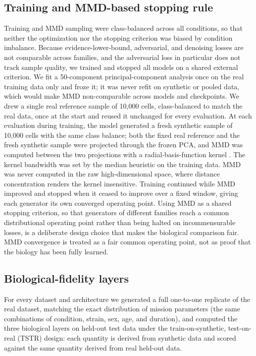 \documentclass[11pt]{article}
\begin{document}
\subsection{Training and MMD-based stopping rule}
Training and MMD sampling were class-balanced across all conditions, so that neither the optimization nor the stopping criterion was biased by condition imbalance. Because evidence-lower-bound, adversarial, and denoising losses are not comparable across families, and the adversarial loss in particular does not track sample quality, we trained and stopped all models on a shared external criterion. We fit a 50-component principal-component analysis once on the real training data only and froze it; it was never refit on synthetic or pooled data, which would make MMD non-comparable across models and checkpoints. We drew a single real reference sample of 10{,}000 cells, class-balanced to match the real data, once at the start and reused it unchanged for every evaluation. At each evaluation during training, the model generated a fresh synthetic sample of 10{,}000 cells with the same class balance; both the fixed real reference and the fresh synthetic sample were projected through the frozen PCA, and MMD was computed between the two projections with a radial-basis-function kernel \cite{gretton,sutherland}. The kernel bandwidth was set by the median heuristic on the training data. MMD was never computed in the raw high-dimensional space, where distance concentration renders the kernel insensitive. Training continued while MMD improved and stopped when it ceased to improve over a fixed window, giving each generator its own converged operating point. Using MMD as a shared stopping criterion, so that generators of different families reach a common distributional operating point rather than being halted on incommensurable losses, is a deliberate design choice that makes the biological comparison fair. MMD convergence is treated as a fair common operating point, not as proof that the biology has been fully learned.

\subsection{Biological-fidelity layers}
For every dataset and architecture we generated a full one-to-one replicate of the real dataset, matching the exact distribution of mission parameters (the same combinations of condition, strain, sex, age, and duration), and computed the three biological layers on held-out test data under the train-on-synthetic, test-on-real (TSTR) design: each quantity is derived from synthetic data and scored against the same quantity derived from real held-out data.
\end{document}
